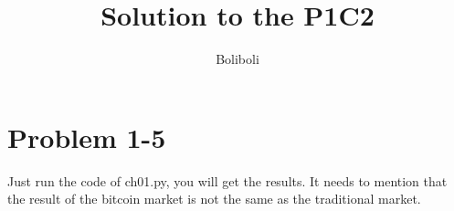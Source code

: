 \documentclass{article}
\begin{document}
\begin{sloppypar}
\title{Solution to the P1C2}
\author{Boliboli}
\maketitle
\section{Problem 1-5}

Just run the code of ch01.py, you will get the results.
It needs to mention that the result of the bitcoin market is not the same as the traditional market.

\end{sloppypar}
\end{document}

